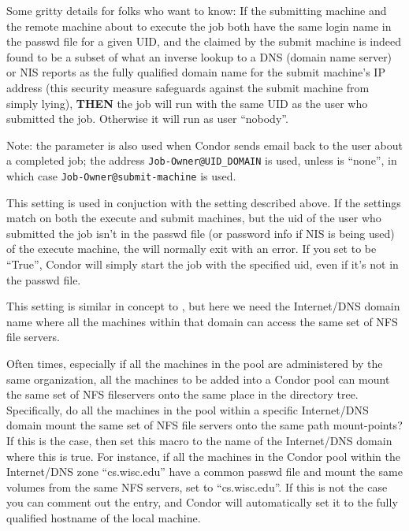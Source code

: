 \begin{description}
  Some gritty details for folks who want to know: If the submitting
  machine and the remote machine about to execute the job both have
  the same login name in the passwd file for a given UID, and the
   claimed by the submit machine is indeed found to
  be a subset of what an inverse lookup to a DNS (domain name server)
  or NIS reports as the fully qualified domain name for the submit
  machine's IP address (this security measure safeguards against the
  submit machine from simply lying), \textbf{THEN} the job will run
  with the same UID as the user who submitted the job.  Otherwise it
  will run as user ``nobody''.
          
  Note: the  parameter is also used when Condor
  sends email back to the user about a completed job; the address
  \texttt{Job-Owner@UID\_DOMAIN} is used, unless 
  is ``none'', in which case \texttt{Job-Owner@submit-machine} is
  used.
  
\item[\Macro{SOFT\_UID\_DOMAIN}] \label{param:SoftUidDomain} This
  setting is used in conjuction with the  setting
  described above.  If the  settings match on both
  the execute and submit machines, but the uid of the user who
  submitted the job isn't in the passwd file (or password info if NIS
  is being used) of the execute machine, the  will
  normally exit with an error.  If you set 
  to be ``True'', Condor will simply start the job with the specified
  uid, even if it's not in the passwd file.

\item[\Macro{FILESYSTEM\_DOMAIN}] \label{param:FilesystemDomain} This
  setting is similar in concept to , but here we
  need the Internet/DNS domain name where all the machines within that
  domain can access the same set of NFS file servers.  
          
  Often times, especially if all the machines in the pool are
  administered by the same organization, all the machines to be added
  into a Condor pool can mount the same set of NFS fileservers onto
  the same place in the directory tree.  Specifically, do all the
  machines in the pool within a specific Internet/DNS domain mount the
  same set of NFS file servers onto the same path mount-points?  If
  this is the case, then set this macro to the name of the
  Internet/DNS domain where this is true.  For instance, if all the
  machines in the Condor pool within the Internet/DNS zone
  ``cs.wisc.edu'' have a common passwd file and mount the same volumes
  from the same NFS servers, set  to
  ``cs.wisc.edu''.  If this is not the case you can comment out the
  entry, and Condor will automatically set it to the fully qualified
  hostname of the local machine.
  

\end{description}
